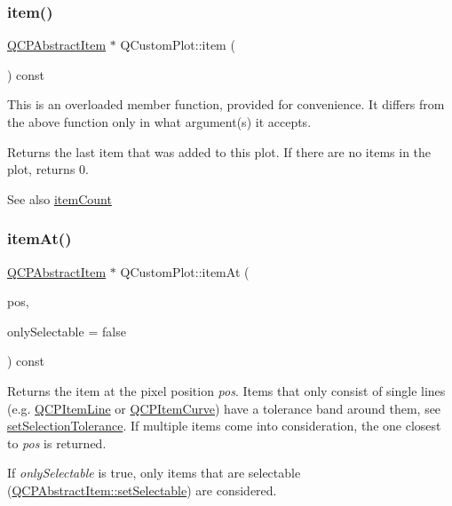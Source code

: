\subsubsection{\texorpdfstring{item()}{item()}\hspace{0.1cm}{\footnotesize\ttfamily [2/2]}}
{\footnotesize\ttfamily \hyperlink{classQCPAbstractItem}{Q\+C\+P\+Abstract\+Item} $\ast$ Q\+Custom\+Plot\+::item (\begin{DoxyParamCaption}{ }\end{DoxyParamCaption}) const}

This is an overloaded member function, provided for convenience. It differs from the above function only in what argument(s) it accepts.

Returns the last item that was added to this plot. If there are no items in the plot, returns 0.

\begin{DoxySeeAlso}{See also}
\hyperlink{classQCustomPlot_a16025daf0341f9362be3080e404424c2}{item\+Count} 
\end{DoxySeeAlso}
\mbox{\label{classQCustomPlot_ac08578e0e6c059c83a8d340ba0038e8e}} 
\subsubsection{\texorpdfstring{item\+At()}{itemAt()}}
{\footnotesize\ttfamily \hyperlink{classQCPAbstractItem}{Q\+C\+P\+Abstract\+Item} $\ast$ Q\+Custom\+Plot\+::item\+At (\begin{DoxyParamCaption}\item[{const Q\+PointF \&}]{pos,  }\item[{bool}]{only\+Selectable = {\ttfamily false} }\end{DoxyParamCaption}) const}

Returns the item at the pixel position {\itshape pos}. Items that only consist of single lines (e.\+g. \hyperlink{classQCPItemLine}{Q\+C\+P\+Item\+Line} or \hyperlink{classQCPItemCurve}{Q\+C\+P\+Item\+Curve}) have a tolerance band around them, see \hyperlink{classQCustomPlot_a4dc31241d7b09680950e19e5f971ed93}{set\+Selection\+Tolerance}. If multiple items come into consideration, the one closest to {\itshape pos} is returned.

If {\itshape only\+Selectable} is true, only items that are selectable (\hyperlink{classQCPAbstractItem_a8a8e32a55bc478b849756a78c2d87fd2}{Q\+C\+P\+Abstract\+Item\+::set\+Selectable}) are considered.

